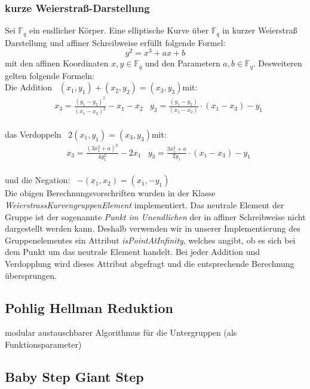 \documentclass{scrartcl}
\begin{document}
\subsubsection{kurze Weierstraß-Darstellung}
\label{sec:weierstrass_kurven}
Sei $\mathbb{F}_q$ ein endlicher Körper.
Eine elliptische Kurve über $\mathbb{F}_q$ in kurzer Weierstraß Darstellung und affiner Schreibweise erfüllt folgende Formel:
$$ y^2 = x^3 + ax +b$$
mit den affinen Koordinaten $x,y \in \mathbb{F}_q$ und den Parametern $a, b \in \mathbb{F}_q$.
Desweiteren gelten folgende Formeln: \vspace{5pt}\\
Die Addition \ $(x_1,y_1)+(x_2,y_2)=(x_3,y_3)$\quad mit: \\
\begin{align*}
  &x_3=\frac{(y_1-y_2)^2}{(x_1-x_2)^2}-x_1-x_2
  &y_3=\frac{(y_1-y_2)}{(x_1-x_2)}\cdot (x_1 - x_3) - y_1
\end{align*}\\
das Verdoppeln \ $ 2(x_1,y_1)=(x_3,y_3) $\quad mit: \\
\begin{align*} 
  &x_3=\frac{(3x_1^2+a)^2}{4y_1^2}-2x_1
  &y_3= \frac{3x_1^2+a}{2y_1} \cdot (x_1 - x_3) - y_1
\end{align*}\\
und die Negation: \ $-(x_1,x_2)=(x_1,-y_1) $ \vspace{5pt} \\
Die obigen Berechnungsvorschriften wurden in der Klasse \emph{WeierstrassKurvengruppenElement} implementiert. Das neutrale Element der Gruppe ist der sogenannte \emph{Punkt im Unendlichen} der in affiner Schreibweise nicht dargestellt werden kann. Deshalb verwenden wir in unserer Implementierung des Gruppenelementes ein Attribut {\emph{isPointAtInfinity}}, welches angibt, ob es sich bei dem Punkt um das neutrale Element handelt. Bei jeder Addition und Verdopplung wird dieses Attribut abgefragt und die entsprechende Berechnung übersprungen.
\subsection{Pohlig Hellman Reduktion}
\label{sec:pohlig_hellman}
modular austauschbarer Algorithmus für die Untergruppen
(als Funktionsparameter)

\cite{Pohlig1978}

\subsection{Baby Step Giant Step}
\label{sec:baby_step_giant_step}
\end{document}
